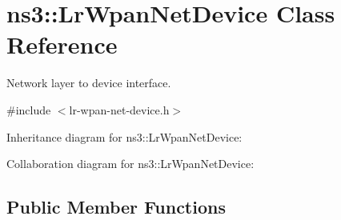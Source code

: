 \hypertarget{classns3_1_1LrWpanNetDevice}{}\section{ns3\+:\+:Lr\+Wpan\+Net\+Device Class Reference}
\label{classns3_1_1LrWpanNetDevice}


Network layer to device interface.  




{\ttfamily \#include $<$lr-\/wpan-\/net-\/device.\+h$>$}



Inheritance diagram for ns3\+:\+:Lr\+Wpan\+Net\+Device\+:


Collaboration diagram for ns3\+:\+:Lr\+Wpan\+Net\+Device\+:
\subsection*{Public Member Functions}
